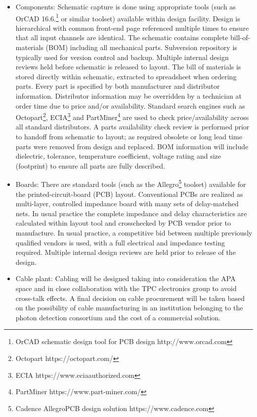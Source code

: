 \begin{itemize}

\item Components: Schematic capture is done using appropriate tools (such as OrCAD 16.6.\footnote{OrCAD\texttrademark{} schematic design tool for PCB design http://www.orcad.com} or similar toolset) available within design facility. Design is hierarchical with common front-end page referenced multiple times to ensure that all input channels are identical. The schematic contains complete bill-of-materials (BOM) including all mechanical parts. Subversion repository is typically used for version control and backup. Multiple internal design reviews held before schematic is released to layout. The bill of materials is stored directly within schematic, extracted to spreadsheet when ordering parts. Every part is specified by both manufacturer and distributor information. Distributor information may be overridden by a technician at order time due to price and/or availability. Standard search engines such as Octopart\footnote{Octopart https://octopart.com/}, ECIA\footnote{ ECIA https://www.eciaauthorized.com} and PartMiner\footnote{PartMiner https://www.part-miner.com/} are used to check price/availability across all standard distributors. A parts availability check review is performed prior to handoff from schematic to layout; as required obsolete or long lead time parts were removed from design and replaced. BOM information will include dielectric, tolerance, temperature coefficient, voltage rating and size (footprint) to ensure all parts are fully described.

\item Boards: There are standard tools (such as the Allegro\footnote{Cadence Allegro\textregistered PCB design solution https://www.cadence.com} toolset) available for the printed-circuit-board (PCB) layout. Conventional PCBs are realized as multi-layer, controlled impedance board with many sets of delay-matched nets. In usual practice the complete impedance and delay characteristics are calculated within layout tool and crosschecked by PCB vendor prior to manufacture. In usual practice, a competitive bid between multiple previously qualified vendors is used, with a full electrical and impedance testing required. Multiple internal design reviews are held prior to release of the design.

\item Cable plant: Cabling will be designed taking into consideration the APA space and in close collaboration with the TPC electronics group to avoid cross-talk effects. A final decision on cable procurement will be taken based on the possibility of cable manufacturing in an institution belonging to the photon detection consortium and the cost of a commercial solution.  


\end{itemize}
